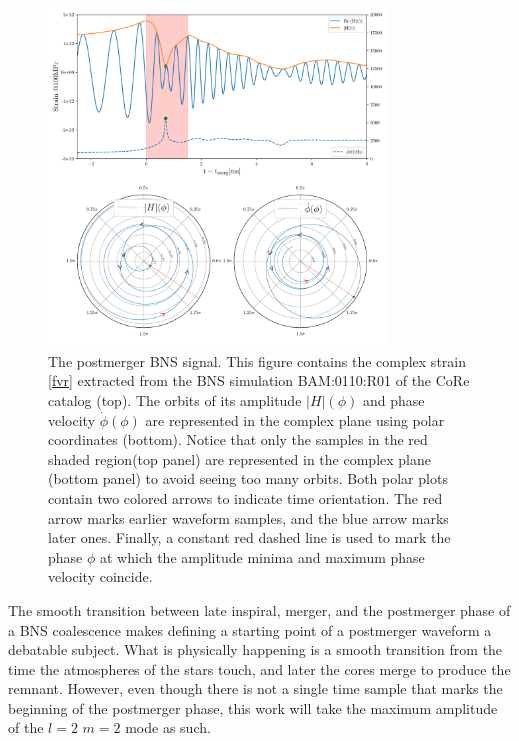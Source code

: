 \begin{figure}[hbt!]
\begin{center}
\includegraphics[width=0.8\textwidth, angle=0]{images/Data_analysis/results/postm_wf.pdf}
\captionsetup{width=0.8\textwidth}
\caption[The postmerger BNS signal]{The postmerger BNS signal. This figure contains the complex strain \ref{fvr} extracted from the BNS simulation BAM:0110:R01 of the CoRe catalog \cite{Dietrich:2018phi}(top). The orbits of its amplitude $|H|(\phi)$ and phase velocity $\dot{\phi}(\phi)$ are represented in the complex plane using polar coordinates (bottom). Notice that only the samples in the red shaded region(top panel) are represented in the complex plane (bottom panel) to avoid seeing too many orbits. Both polar plots contain two colored arrows to indicate time orientation. The red arrow marks earlier waveform samples, and the blue arrow marks later ones. Finally, a constant red dashed line is used to mark the phase $\phi$ at which the amplitude minima and maximum phase velocity coincide.}
\label{fig:9} 
\end{center}
\end{figure}

\FloatBarrier

The smooth transition between late inspiral, merger, and the postmerger phase of a BNS coalescence makes defining a starting point of a postmerger waveform a debatable subject. What is physically happening is a smooth transition from the time the atmospheres of the stars touch, and later the cores merge to produce the remnant. However, even though there is not a single time sample that marks the beginning of the postmerger phase, this work will take the maximum amplitude of the $l=2$ $m=2$ mode as such. 

